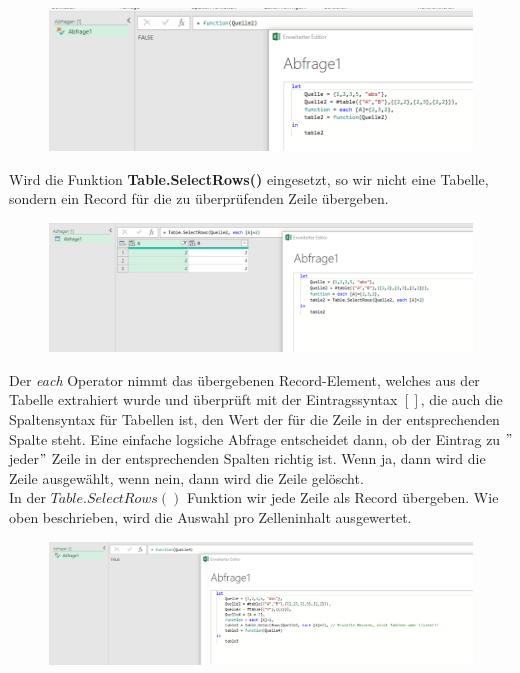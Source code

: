 \begin{figure}[H]
	\centering
	\includegraphics[scale = 0.3]{attachment/chapter_1/screenshot041}
	\caption{}
	\label{fig:screenshot041}
\end{figure}
Wird die Funktion \textbf{Table.SelectRows()} eingesetzt, so wir nicht eine Tabelle, sondern ein Record für die zu überprüfenden Zeile übergeben.

\begin{figure}[H]
	\centering
	\includegraphics[scale = 0.3]{attachment/chapter_1/screenshot042}
	\caption{}
	\label{fig:screenshot042}
\end{figure}

Der \textit{each} Operator nimmt das übergebenen Record-Element, welches aus der Tabelle extrahiert wurde und überprüft mit der Eintragssyntax $[]$, die auch die Spaltensyntax für Tabellen ist, den Wert der für die Zeile in der entsprechenden Spalte steht. Eine einfache logsiche Abfrage entscheidet dann, ob der Eintrag zu $"$jeder$"$ Zeile in der entsprechenden Spalten richtig ist. Wenn ja, dann wird die Zeile ausgewählt, wenn nein, dann wird die Zeile gelöscht.\\
In der $Table.SelectRows()$ Funktion wir jede Zeile als Record übergeben. Wie oben beschrieben, wird die Auswahl pro Zelleninhalt ausgewertet.
\begin{figure}[H]
	\centering
	\includegraphics[scale = 0.3]{attachment/chapter_1/screenshot048}
	\caption{}
	\label{fig:screenshot048}
\end{figure} 

